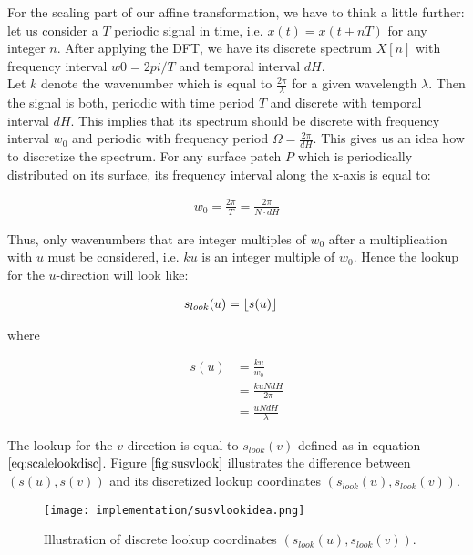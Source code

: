 For the scaling part of our affine transformation, we have to think a little further: let us consider a $T$ periodic signal in time, i.e. $x(t) = x(t+nT)$ for any integer $n$. After applying the DFT, we have its discrete spectrum $X[n]$ with frequency interval $w0 = 2pi / T$ and temporal interval $dH$. \\

Let $k$ denote the wavenumber which is equal to $\frac{2 \pi}{\lambda}$ for a given wavelength $\lambda$. Then the signal is both, periodic with time period $T$ and discrete with temporal interval $dH$. This implies that its spectrum should be discrete with frequency interval $w_0$ and periodic with frequency period $\Omega = \frac{2 \pi}{dH}$. This gives us an idea how to discretize the spectrum. For any surface patch $P$ which is periodically distributed on its surface, its frequency interval along the x-axis is equal to: 

\begin{align}
  w_0 = \frac{2 \pi}{T} = \frac{2 \pi}{N \cdot dH}
\end{align}

Thus, only wavenumbers that are integer multiples of $w_0$ after a multiplication with $u$ must be considered, i.e. $ku$ is an integer multiple of $w_0$. Hence the lookup for the $u$-direction will look like:

\begin{align}
    s_{look}(u)
    &=\lfloor s(u)\rfloor
\label{eq:scalelookdisc}
\end{align}

where 

\begin{align}
    s(u)
    &=\frac{ku}{w_0} \nonumber \\
    &= \frac{ku N dH}{2 \pi} \nonumber \\
    &= \frac{u N dH}{\lambda}
\label{eq:scalelook}
\end{align}

The lookup for the $v$-direction is equal to $s_{look}(v)$ defined as in equation $\ref{eq:scalelookdisc}$. Figure $\ref{fig:susvlook}$ illustrates the difference between $\left( s(u), s(v) \right)$ and its discretized lookup coordinates $\left( s_{look}(u), s_{look}(v) \right)$.

\begin{figure}[H]
  \centering
  \texttt{[image: implementation/susvlookidea.png]}
  \caption[Discretized Lookup]{Illustration of discrete lookup coordinates $\left( s_{look}(u), s_{look}(v) \right)$.}
\label{fig:susvlook}
\end{figure}


